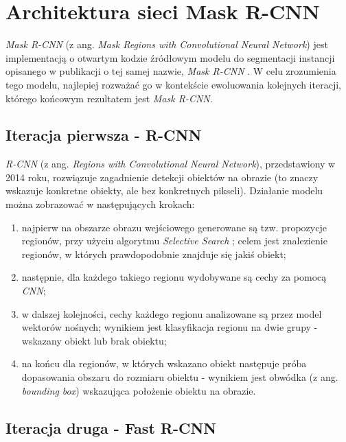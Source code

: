 \section{Architektura sieci Mask R-CNN}
\label{sec:architekrura_mask_rcnn}

\textit{Mask R-CNN} \cite{matterport-mask-rcnn} (z ang. \textit{Mask Regions with Convolutional Neural Network}) jest implementacją o otwartym kodzie źródłowym modelu do segmentacji instancji opisanego w publikacji o tej samej nazwie, \textit{Mask R-CNN} \cite{general-mask-rcnn}.
W celu zrozumienia tego modelu, najlepiej rozważać go w kontekście ewoluowania kolejnych iteracji, którego końcowym rezultatem jest \textit{Mask R-CNN}.

\subsection{Iteracja pierwsza - R-CNN}


\textit{R-CNN} \cite{rcnn} (z ang. \textit{Regions with Convolutional Neural Network}), przedstawiony w 2014 roku, rozwiązuje zagadnienie detekcji obiektów na obrazie (to znaczy wskazuje konkretne obiekty, ale bez konkretnych pikseli).
Działanie modelu można zobrazować w następujących krokach:

\begin{enumerate}
  \item najpierw na obszarze obrazu wejściowego generowane są tzw. propozycje regionów, przy użyciu algorytmu \textit{Selective Search} \cite{selective-search}; celem jest znalezienie regionów, w których prawdopodobnie znajduje się jakiś obiekt;
	\item następnie, dla każdego takiego regionu wydobywane są cechy za pomocą \textit{CNN};
  \item w dalszej kolejności, cechy każdego regionu analizowane są przez model wektorów nośnych; wynikiem jest klasyfikacja regionu na dwie grupy - wskazany obiekt lub brak obiektu;
	\item na końcu dla regionów, w których wskazano obiekt następuje próba dopasowania obszaru do rozmiaru obiektu - wynikiem jest obwódka (z ang. \textit{bounding box}) wskazująca położenie obiektu na obrazie.
\end{enumerate}

\newpage
\subsection{Iteracja druga - Fast R-CNN}

